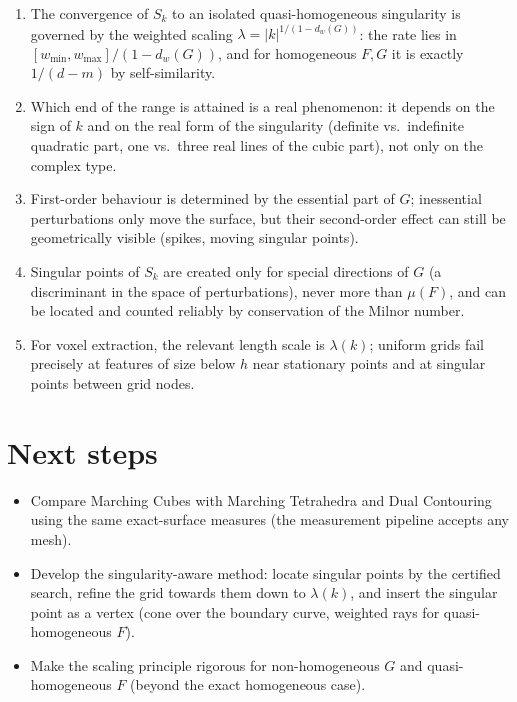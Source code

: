 \documentclass[11pt, a4paper]{article}
\theoremstyle{plain}
\theoremstyle{definition}
\theoremstyle{remark}
\theoremstyle{definition}
\begin{document}
\begin{enumerate}
    \item The convergence of $S_k$ to an isolated quasi-homogeneous singularity is
          governed by the weighted scaling $\lambda=|k|^{1/(1-d_w(G))}$: the rate lies
          in $[w_{\min},w_{\max}]/(1-d_w(G))$, and for homogeneous $F,G$ it is exactly
          $1/(d-m)$ by self-similarity.
    \item Which end of the range is attained is a real phenomenon: it depends on the
          sign of $k$ and on the real form of the singularity (definite vs.\ indefinite
          quadratic part, one vs.\ three real lines of the cubic part), not only on the
          complex type.
    \item First-order behaviour is determined by the essential part of $G$;
          inessential perturbations only move the surface, but their second-order
          effect can still be geometrically visible (spikes, moving singular points).
    \item Singular points of $S_k$ are created only for special directions of $G$ (a
          discriminant in the space of perturbations), never more than $\mu(F)$, and
          can be located and counted reliably by conservation of the Milnor number.
    \item For voxel extraction, the relevant length scale is $\lambda(k)$; uniform grids
          fail precisely at features of size below $h$ near stationary points and at
          singular points between grid nodes.
\end{enumerate}

\section{Next steps}

\begin{itemize}
    \item Compare Marching Cubes with Marching Tetrahedra and Dual Contouring using
          the same exact-surface measures (the measurement pipeline accepts any mesh).
    \item Develop the singularity-aware method: locate singular points by the
          certified search, refine the grid towards them down to $\lambda(k)$, and
          insert the singular point as a vertex (cone over the boundary curve, weighted
          rays for quasi-homogeneous $F$).
    \item Make the scaling principle rigorous for non-homogeneous $G$ and
          quasi-homogeneous $F$ (beyond the exact homogeneous case).
\end{itemize}



\end{document}
